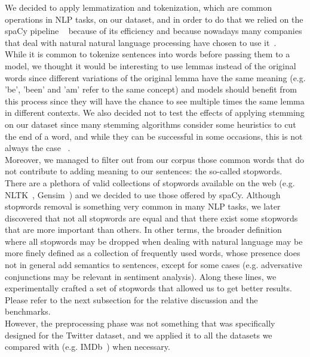 We decided to apply lemmatization and tokenization, which are common operations in NLP tasks, on our dataset, and in order to do that we relied on the spaCy pipeline ~\cite{startups:spaCy} because of its efficiency and because nowadays many companies that deal with natural natural language processing have chosen to use it~\cite{data:companies_using_spacy}.\\

While it is common to tokenize sentences into words before passing them to a model, we thought it would be interesting to use lemmas instead of the original words since different variations of the original lemma have the same meaning (e.g. 'be', 'been' and 'am' refer to the same concept) and models should benefit from this process since they will have the chance to see multiple times the same lemma in different contexts. We also decided not to test the effects of applying stemming on our dataset since many stemming algorithms consider some heuristics to cut the end of a word, and while they can be successful in some occasions, this is not always the case ~\cite{data:standfordNLP}.\\

Moreover, we managed to filter out from our corpus those common words that do not contribute to adding meaning to our sentences: the so-called stopwords. There are a plethora of valid collections of stopwords available on the web (e.g. NLTK~\cite{startups:nltk}, Gensim~\cite{startups:gensim}) and we decided to use those offered by spaCy. Although stopwords removal is something very common in many NLP tasks, we later discovered that not all stopwords are equal and that there exist some stopwords that are more important than others. In other terms, the broader definition where all stopwords may be dropped when dealing with natural language may be more finely defined as a collection of frequently used words, whose presence does not in general add semantics to sentences, except for some cases (e.g. adversative conjunctions may be relevant in sentiment analysis).
Along these lines, we experimentally crafted a set of stopwords that allowed us to get better results. Please refer to the next subsection for the relative discussion and the benchmarks.\\

However, the preprocessing phase was not something that was specifically designed for the Twitter dataset, and we applied it to all the datasets we compared with (e.g. IMDb~\cite{data:imdb}) when necessary.

